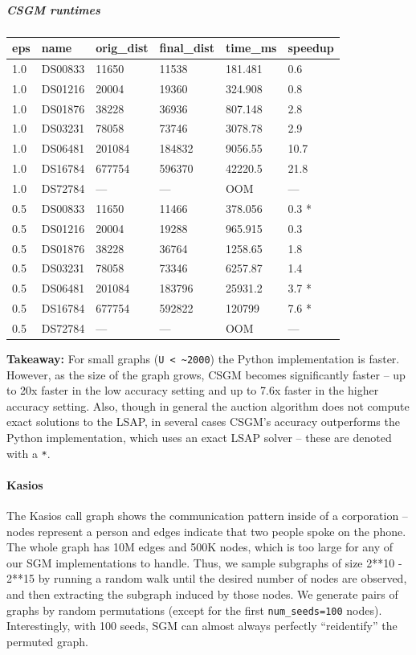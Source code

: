 \documentclass[10pt,oneside]{memoir}
\let\oldparagraph\paragraph
\renewcommand{\paragraph}[1]{\oldparagraph{#1}\mbox{}}
\let\oldsubparagraph\subparagraph
\renewcommand{\subparagraph}[1]{\oldsubparagraph{#1}\mbox{}}
\begin{document}
\hypertarget{csgm-runtimes}{%
\subparagraph{CSGM runtimes}\label{csgm-runtimes}}

\begin{longtable}[]{@{}llllll@{}}
\toprule
eps & name & orig\_dist & final\_dist & time\_ms &
speedup\tabularnewline
\midrule
\endhead
1.0 & DS00833 & 11650 & 11538 & 181.481 & 0.6\tabularnewline
1.0 & DS01216 & 20004 & 19360 & 324.908 & 0.8\tabularnewline
1.0 & DS01876 & 38228 & 36936 & 807.148 & 2.8\tabularnewline
1.0 & DS03231 & 78058 & 73746 & 3078.78 & 2.9\tabularnewline
1.0 & DS06481 & 201084 & 184832 & 9056.55 & 10.7\tabularnewline
1.0 & DS16784 & 677754 & 596370 & 42220.5 & 21.8\tabularnewline
1.0 & DS72784 & --- & --- & OOM & ---\tabularnewline
0.5 & DS00833 & 11650 & 11466 & 378.056 & 0.3 *\tabularnewline
0.5 & DS01216 & 20004 & 19288 & 965.915 & 0.3\tabularnewline
0.5 & DS01876 & 38228 & 36764 & 1258.65 & 1.8\tabularnewline
0.5 & DS03231 & 78058 & 73346 & 6257.87 & 1.4\tabularnewline
0.5 & DS06481 & 201084 & 183796 & 25931.2 & 3.7 *\tabularnewline
0.5 & DS16784 & 677754 & 592822 & 120799 & 7.6 *\tabularnewline
0.5 & DS72784 & --- & --- & OOM & ---\tabularnewline
\bottomrule
\end{longtable}

\textbf{Takeaway:} For small graphs
(\texttt{\textbar{}U\textbar{}\ \textless{}\ \textasciitilde{}2000}) the
Python implementation is faster. However, as the size of the graph
grows, CSGM becomes significantly faster -- up to 20x faster in the low
accuracy setting and up to 7.6x faster in the higher accuracy setting.
Also, though in general the auction algorithm does not compute exact
solutions to the LSAP, in several cases CSGM's accuracy outperforms the
Python implementation, which uses an exact LSAP solver -- these are
denoted with a \texttt{*}.

\hypertarget{kasios}{%
\paragraph{Kasios}\label{kasios}}

The Kasios call graph shows the communication pattern inside of a
corporation -- nodes represent a person and edges indicate that two
people spoke on the phone. The whole graph has 10M edges and 500K nodes,
which is too large for any of our SGM implementations to handle. Thus,
we sample subgraphs of size 2**10 - 2**15 by running a random walk until
the desired number of nodes are observed, and then extracting the
subgraph induced by those nodes. We generate pairs of graphs by random
permutations (except for the first \texttt{num\_seeds=100} nodes).
Interestingly, with 100 seeds, SGM can almost always perfectly
``reidentify'' the permuted graph.
\end{document}
